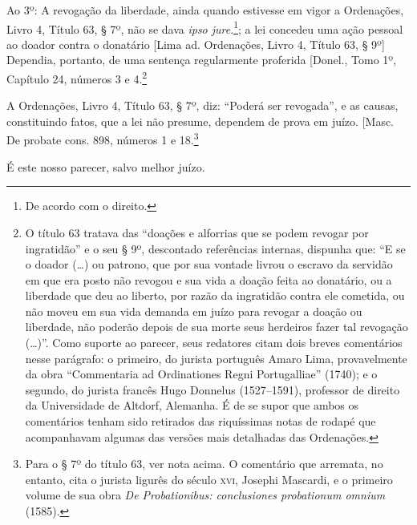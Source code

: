 Ao 3º: A revogação da liberdade, ainda quando estivesse em vigor a
Ordenações, Livro 4, Título 63, § 7º, não se dava
\emph{ipso jure}.\footnote{De acordo com o direito.}; a lei concedeu
uma ação pessoal ao doador contra o donatário {[}Lima ad.
Ordenações, Livro 4, Título 63, § 9º{]} Dependia,
portanto, de uma sentença regularmente proferida {[}Donel., Tomo 1º,
Capítulo 24, números 3 e 4.\footnote{O título 63 tratava
  das ``doações e alforrias que se podem revogar por ingratidão'' e o seu
  § 9º, descontado referências internas, dispunha que: ``E se o doador
  (\ldots{}) ou patrono, que por sua vontade livrou o escravo da servidão em
  que era posto não revogou e sua vida a doação feita ao donatário, ou a
  liberdade que deu ao liberto, por razão da ingratidão contra ele
  cometida, ou não moveu em sua vida demanda em juízo para revogar a
  doação ou liberdade, não poderão depois de sua morte seus herdeiros
  fazer tal revogação (\ldots{})''. Como suporte ao parecer, seus redatores
  citam dois breves comentários nesse parágrafo: o primeiro, do jurista
  português Amaro Lima, provavelmente da obra ``Commentaria ad
  Ordinationes Regni Portugalliae'' (1740); e o segundo, do jurista
  francês Hugo Donnelus (1527--1591), professor de direito da
  Universidade de Altdorf, Alemanha. É de se supor que ambos os
  comentários tenham sido retirados das riquíssimas notas de rodapé que
  acompanhavam algumas das versões mais detalhadas das Ordenações.}

A Ordenações, Livro 4, Título 63, § 7º, diz: ``Poderá
ser revogada'', e as causas, constituindo fatos, que a lei não presume,
dependem de prova em juízo. {[}Masc. De probate cons. 898, números
1 e 18.\footnote{Para o § 7º do título 63, ver nota acima. O
  comentário que arremata, no entanto, cita o jurista ligurês do século
  \textsc{xvi}, Josephi Mascardi, e o primeiro volume de sua obra \emph{De
  Probationibus: conclusiones probationum omnium} (1585).}

É este nosso parecer, salvo melhor juízo.

